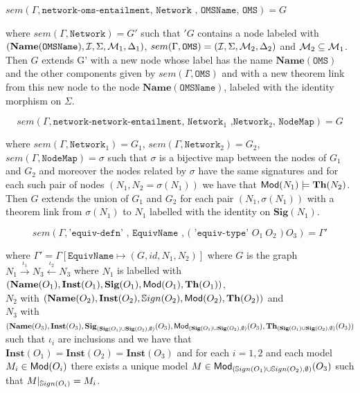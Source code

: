 \documentclass[10pt,fleqn,%
\ifpretendfinal
final%
\else
draft%
\fi,
]{scrreprt}
\newcommand*{\syntax}[1]{\texttt{#1}}
\newcommand{\Sig}{\mathbf{Sig}}
\newcommand{\Inst}{\ensuremath{\mathbf{Inst}}}
\newcommand{\Name}{\ensuremath{\mathbf{Name}}}
\newcommand{\semdom}[1]{
\begin{center}
\fbox{$#1$}
\end{center}
}
\begin{document}
$sem(\Gamma,\syntax{network-oms-entailment, Network , OMSName, OMS}) = G$

\noindent where $sem(\Gamma, \syntax{Network}) = G'$ such that $'G$ contains a node labeled with 
$(\Name(\syntax{OMSName}), \cI, \Sigma,\cM_1,\Delta_1)$,
$sem(\Gamma,\syntax{OMS}) = (\cI,\Sigma,\cM_2,\Delta_2)$ and ${\cal M}_2 \subseteq {\cal M}_1$. Then 
$G$ extends G' with a new node whose label has 
the name $\Name(\syntax{OMS})$ and the other 
components given by $sem(\Gamma,\syntax{OMS})$ and with
a new theorem link from this new node to the node $\Name(\syntax{OMSName})$, labeled with
the identity morphism on $\Sigma$.

$$sem(\Gamma,\syntax{network-network-entailment, Network$_1$ ,Network$_2$, NodeMap}) = G$$

\noindent where $sem(\Gamma, \syntax{Network}_1) = G_1$,
$sem(\Gamma, \syntax{Network}_2) = G_2$, 
$sem(\Gamma, \syntax{NodeMap}) = \sigma$ 
such that $\sigma$ is a bijective map
between the nodes
of $G_1$ and $G_2$ and moreover the nodes related by 
$\sigma$ have the same signatures and
for each such pair of nodes $(N_1, N_2 = \sigma(N_1))$
 we have that $\mathsf{Mod}(N_1)\models \mathbf{Th}(N_2)$.
Then $G$ extends the union of $G_1$ and $G_2$ for each 
pair $(N_1, \sigma(N_1))$ with a theorem link 
from $\sigma(N_1)$ to $N_1$ labelled with the identity
on $\Sig(N_1)$. 



\semdom{sem(\Gamma,\syntax{EquivDefn})=\Gamma'}

$$sem(\Gamma,\syntax{'equiv-defn' , EquivName , ( 'equiv-type' }O_1\ O_2\syntax{ )}\ O_3)=\Gamma'$$

\noindent where 
$\Gamma' = \Gamma[\syntax{EquivName} \mapsto (G, id, N_1, N_2)]$
where 
$G$ is the graph
$N_1 \stackrel{\iota_1}{\rightarrow} N_3 \stackrel{\iota_2}{\leftarrow} 
N_3$ where
$N_1$ is labelled with $(\Name(O_1), \Inst(O_1), \Sig(O_1),\Mod(O_1), \Th(O_1))$,\\
$N_2$ with $(\Name(O_2), \Inst(O_2),\Sign(O_2), \Mod(O_2), \Th(O_2))$
and \\
$N_3$ with $(\Name(O_3), \Inst(O_3), \Sig_{(\Sig(O_1)\cup\Sig(O_2),\emptyset)}(O_3), \Mod_{(\Sig(O_1)\cup\Sig(O_2),\emptyset)}(O_3),\allowbreak  \Th_{(\Sig(O_1)\cup\Sig(O_2),\emptyset)}(O_3))$\\
such that
$\iota_i$ are inclusions and we have that 
$\Inst(O_1) = \Inst(O_2) = \Inst(O_3)$ and 
for each $i = 1,2$ and each model $M_i \in \mathsf{Mod}(O_i)$ there exists a unique model $M\in \mathsf{Mod}_{(\mathbb{S}ign(O_1)\cup\mathbb{S}ign(O_2),\emptyset)}(O_3)$
such that $M|_{\mathbb{S}ign(O_i)} = M_i$. 
\end{document}
